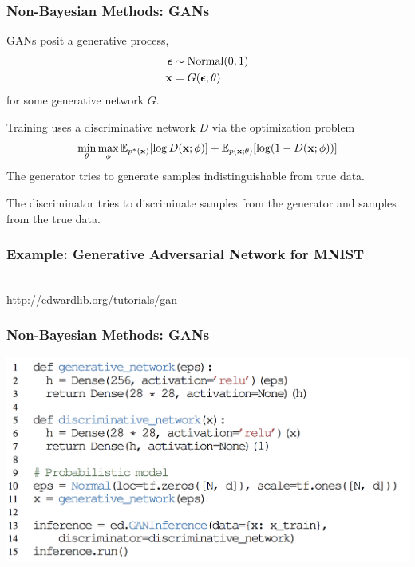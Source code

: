 \documentclass[10pt,
               xcolor={usenames,dvipsnames},
               hyperref={colorlinks,linktoc=all,citecolor=Plum,linkcolor=MidnightBlue,urlcolor=MidnightBlue},noamssymb]{beamer}
\begin{document}
\begin{frame}
\frametitle{Non-Bayesian Methods: GANs}
GANs posit a generative process,
\begin{align*}
\boldsymbol{\mathbf{\epsilon}} &\sim \text{Normal}(0, 1) \\
\boldsymbol{\mathbf{x}} &= G(\boldsymbol{\mathbf{\epsilon}};\theta)
\end{align*}
for some generative network $G$.

Training uses a discriminative network $D$ via the
optimization problem
\begin{equation*}
\min_\theta \max_\phi
\mathbb{E}_{p^*(\boldsymbol{\mathbf{x}})} [ \log D(\boldsymbol{\mathbf{x}}; \phi) ]
+ \mathbb{E}_{p(\boldsymbol{\mathbf{x}}; \theta)} [ \log (1 - D(\boldsymbol{\mathbf{x}}; \phi)) ]
\end{equation*}
The generator tries to generate samples indistinguishable from true data.

The discriminator tries to discriminate samples from the generator and
samples from the true data.

\end{frame}

\begin{frame}
\frametitle{Example: Generative Adversarial Network for MNIST}
\vspace{10ex}
\begin{center}
\gray{\Large [Demo]} \\[3ex]
{\large \url{http://edwardlib.org/tutorials/gan}}
\end{center}
\end{frame}

\begin{frame}
\frametitle{Non-Bayesian Methods: GANs}
\begin{center}
\vspace{-2ex}
\includegraphics[width=1.0\textwidth]{img/gan_example.png}
\end{center}
\end{frame}
\end{document}
